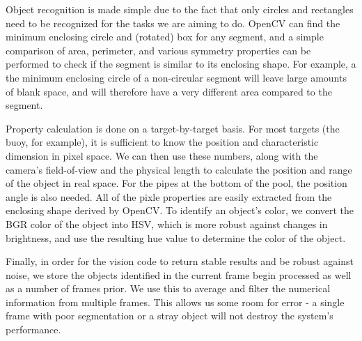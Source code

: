 Object recognition is made simple due to the fact that only circles and rectangles need to be recognized for the tasks we are aiming to do. OpenCV can find the minimum enclosing circle and (rotated) box for any segment, and a simple comparison of area, perimeter, and various symmetry properties can be performed to check if the segment is similar to its enclosing shape. For example, a the minimum enclosing circle of a non-circular segment will leave large amounts of blank space, and will therefore have a very different area compared to the segment.

Property calculation is done on a target-by-target basis. For most targets (the buoy, for example), it is  sufficient to know the position and characteristic dimension in pixel space. We can then use these numbers, along with the camera's field-of-view and the physical length to calculate the position and range of the object in real space. For the pipes at the bottom of the pool, the position angle is also needed. All of the pixle properties are easily extracted from the enclosing shape derived by OpenCV. To identify an object's color, we convert the BGR color of the object into HSV, which is more robust against changes in brightness, and use the resulting hue value to determine the color of the object.

Finally, in order for the vision code to return stable results and be robust against noise, we store the objects identified in the current frame begin processed as well as a number of frames prior. We use this to average and filter the numerical information from multiple frames. This allows us some room for error - a single frame with poor segmentation or a stray object will not destroy the system's performance.

